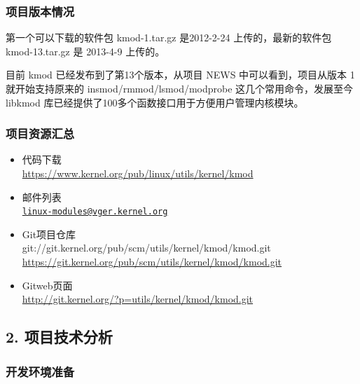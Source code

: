 \documentclass[11pt,a4paper]{article}
\begin{document}
\subsubsection{项目版本情况}

第一个可以下载的软件包 kmod-1.tar.gz 是2012-2-24 上传的，最新的软件包
kmod-13.tar.gz 是 2013-4-9 上传的。

目前 kmod 已经发布到了第13个版本，从项目 NEWS 中可以看到，项目从版本 1
就开始支持原来的 insmod/rmmod/lsmod/modprobe
这几个常用命令，发展至今libkmod
库已经提供了100多个函数接口用于方便用户管理内核模块。

\subsubsection{项目资源汇总}

\begin{itemize}
\item
  代码下载\\ \url{https://www.kernel.org/pub/linux/utils/kernel/kmod}
\item
  邮件列表\\
  \href{mailto:linux-modules@vger.kernel.org}{\texttt{linux-modules@vger.kernel.org}}
\item
  Git项目仓库\\
  git://git.kernel.org/pub/scm/utils/kernel/kmod/kmod.git\\
  \url{https://git.kernel.org/pub/scm/utils/kernel/kmod/kmod.git}
\item
  Gitweb页面\\ \url{http://git.kernel.org/?p=utils/kernel/kmod/kmod.git}
\end{itemize}
\subsection{2. 项目技术分析}

\subsubsection{开发环境准备}
\end{document}
